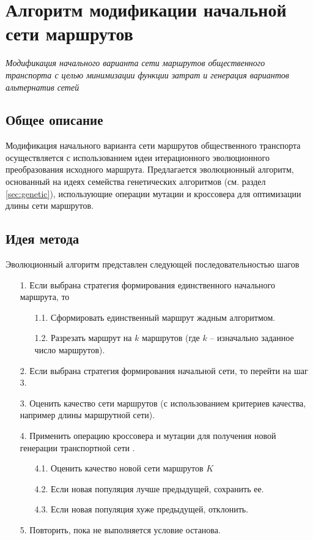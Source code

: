 \clearpage

\section{Алгоритм модификации начальной сети маршрутов}\label{sec:third-alg}
\emph{Модификация начального варианта сети маршрутов общественного транспорта с целью минимизации функции 
затрат и генерация вариантов альтернатив сетей}
\subsection{Общее описание}
Модификация начального варианта сети маршрутов общественного транспорта осуществляется с использованием идеи 
итерационного эволюционного преобразования исходного маршрута. Предлагается эволюционный алгоритм, основанный 
на идеях семейства генетических алгоритмов (см. раздел \ref{sec:genetic}), использующие операции мутации и 
кроссовера для оптимизации длины сети маршрутов.

\subsection{Идея метода}
Эволюционный алгоритм представлен следующей последовательностью шагов
\begin{enumerate}
    \item[1.] Если выбрана стратегия формирования единственного начального маршрута, то 
    \begin{enumerate}
        \item[1.1.] Сформировать единственный маршрут жадным алгоритмом.
        \item[1.2.] Разрезать маршрут на \( k \) маршрутов (где \( k \) -- изначально заданное число 
            маршрутов).
    \end{enumerate}
    \item[2.] Если выбрана стратегия формирования начальной сети, то перейти на шаг 3.
    \item[3.] Оценить качество сети маршрутов (с использованием критериев качества, например длины 
        маршрутной сети).
    \item[4.] Применить операцию кроссовера и мутации для получения новой генерации транспортной 
        сети \cite{bib:20}.
    \begin{enumerate}
        \item[4.1.] Оценить качество новой сети маршрутов \( K \)
        \item[4.2.] Если новая популяция лучше предыдущей, сохранить ее.
        \item[4.3.] Если новая популяция хуже предыдущей, отклонить. 
    \end{enumerate}
    \item[5.] Повторить, пока не выполняется условие останова.
\end{enumerate}

